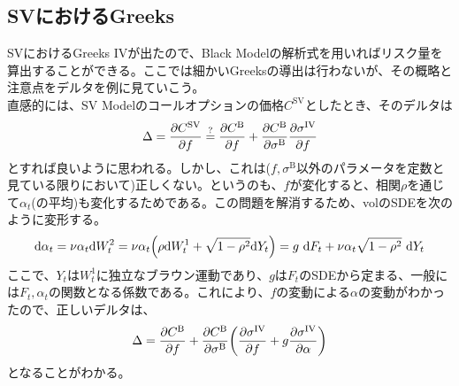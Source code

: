 \documentclass[dvipdfmx,9pt]{beamer}
\begin{document}
\subsection{SVにおけるGreeks}
\begin{frame}{SVにおけるGreeks}
  IVが出たので、Black Modelの解析式を用いればリスク量を算出することができる。ここでは細かいGreeksの導出は行わないが、その概略と注意点をデルタを例に見ていこう。
  \\
  直感的には、SV Modelのコールオプションの価格$C^{\mathrm{SV}}$としたとき、そのデルタは
  \begin{equation}
    \Delta = \pdv{C^{\mathrm{SV}}}{f} \overset{?}{=} \pdv{C^{\mathrm{B}}}{f} + \pdv{C^{\mathrm{B}}}{\sigma^{\mathrm{B}}} \pdv{\sigma^{\mathrm{IV}}}{f}
  \end{equation}
  とすれば良いように思われる。しかし、これは($f,\sigma^{\mathrm{B}}$以外のパラメータを定数と見ている限りにおいて)正しくない。というのも、$f$が変化すると、相関$\rho$を通じて$\alpha_{t}$(の平均)も変化するためである。この問題を解消するため、volのSDEを次のように変形する。
  \begin{equation}
    \dd \alpha_{t} = \nu \alpha_{t} \dd W_{t}^{2} = \nu\alpha_{t}\pqty{\rho \dd W_{t}^{1} + \sqrt{1-\rho^{2}} \dd Y_{t}} = g~\dd F_{t} + \nu\alpha_{t}\sqrt{1-\rho^{2}}~\dd Y_{t}
  \end{equation}
  ここで、$Y_{t}$は$W_{t}^{1}$に独立なブラウン運動であり、$g$は$F_{t}$のSDEから定まる、一般には$F_{t},\alpha_{t}$の関数となる係数である。これにより、$f$の変動による$\alpha$の変動がわかったので、正しいデルタは、
  \begin{equation}
    \Delta = \pdv{C^{\mathrm{B}}}{f} + \pdv{C^{\mathrm{B}}}{\sigma^{\mathrm{B}}} \pqty{ \pdv{\sigma^{\mathrm{IV}}}{f} + g\pdv{\sigma^{\mathrm{IV}}}{\alpha}}
  \end{equation}
  となることがわかる。
\end{frame}
\end{document}
